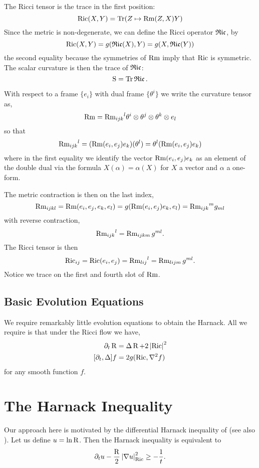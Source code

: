 \documentclass{amsart}
\begin{document}
The Ricci tensor is the trace in the first position:
\[
\operatorname{Ric}(X, Y) = \operatorname{Tr} (Z \mapsto \operatorname{Rm}(Z, X)Y)
\]
Since the metric is non-degenerate, we can define the Ricci operator \(\operatorname{\mathfrak{Ric}}\), by
\[
\operatorname{Ric}(X, Y) = g(\operatorname{\mathfrak{Ric}}(X), Y) = g(X, \operatorname{\mathfrak{Ric}}(Y))
\]
the second equality because the symmetries of \(\operatorname{Rm}\) imply that \(\operatorname{Ric}\) is symmetric. The scalar curvature is then the trace of \(\operatorname{\mathfrak{Ric}}\):
\[
\operatorname{S} = \operatorname{Tr} \operatorname{\mathfrak{Ric}}.
\]

With respect to a frame \(\{e_i\}\) with dual frame \(\{\theta^i\}\) we write the curvature tensor as,
\[
\operatorname{Rm} = {\operatorname{Rm}_{ijk}}^l \theta^i \otimes \theta^j \otimes \theta^k \otimes e_l
\]
so that
\[
{\operatorname{Rm}_{ijk}}^l = (\operatorname{Rm}(e_i, e_j) e_k) (\theta^l) = \theta^l (\operatorname{Rm}(e_i, e_j) e_k)
\]
where in the first equality we identify the vector \(\operatorname{Rm}(e_i, e_j)e_k\) as an element of the double dual via the formula \(X(\alpha) = \alpha(X)\) for \(X\) a vector and \(\alpha\) a one-form.

The metric contraction is then on the last index,
\[
\operatorname{Rm}_{ijkl} = \operatorname{Rm}(e_i, e_j, e_k, e_l) = g(\operatorname{Rm}(e_i, e_j) e_k, e_l) = {\operatorname{Rm}_{ijk}}^mg_{ml}
\]
with reverse contraction,
\[
{\operatorname{Rm}_{ijk}}^l = \operatorname{Rm}_{ijkm} g^{ml}.
\]
The Ricci tensor is then
\[
\operatorname{Ric}_{ij} = \operatorname{Ric}(e_i, e_j) = {\operatorname{Rm}_{lij}}^l = \operatorname{Rm}_{lijm} g^{ml}.
\]
Notice we trace on the first and fourth slot of \(\operatorname{Rm}\).

\subsection{Basic Evolution Equations}
\label{subsec:evolution}

We require remarkably little evolution equations to obtain the Harnack. All we require is that under the Ricci flow we have,
\begin{align}
\partial_t \R &= \laplace \R + 2 \abs{\ric}^2 \label{eq:R_ev} \\
[\partial_t, \laplace] f &= 2 g(\ric, \nabla^2 f) \label{eq:R_commutator}
\end{align}
for any smooth function \(f\).

\section{The Harnack Inequality}
\label{sec:harnack}

Our approach here is motivated by the differential Harnack inequality of \cite{LiYau:/1986} (see also \cite{Hamilton:/1986,HamiltonCao:/2009}). Let us define \(u = \ln \operatorname{R}\). Then the Harnack inequality is equivalent to
\begin{equation}
\label{eq:harnack_equiv}
\partial_t u - \frac{\operatorname{R}}{2} \left|{\nabla u}\right|_{\operatorname{Ric}}^2 \geq - \frac{1}{t}.
\end{equation}
\end{document}
